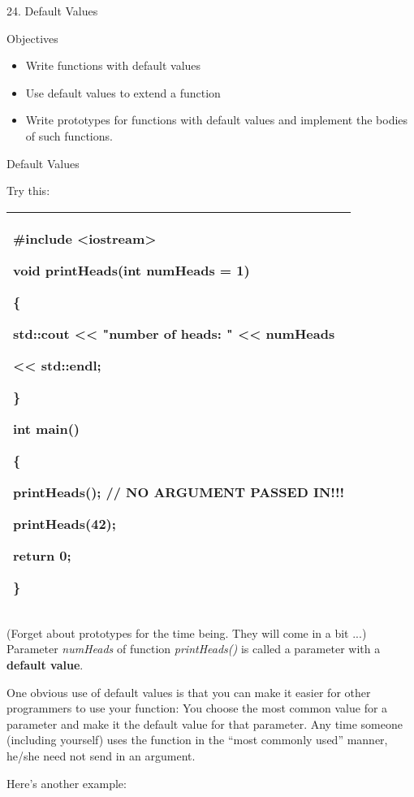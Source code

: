 \documentclass[
]{article}
\author{}
\date{}
\providecommand{\tightlist}{%
  \setlength{\itemsep}{0pt}\setlength{\parskip}{0pt}}
\begin{document}
24. Default Values

Objectives

\begin{itemize}
\tightlist
\item
  Write functions with default values
\item
  Use default values to extend a function
\item
  Write prototypes for functions with default values and implement the
  bodies of such functions.
\end{itemize}

Default Values

Try this:

\begin{longtable}[]{@{}l@{}}
\toprule
\endhead
\begin{minipage}[t]{0.97\columnwidth}\raggedright
\#include \textless iostream\textgreater{}

void printHeads(int numHeads\textbf{ = 1})

\{

std::cout \textless\textless{} "number of heads: " \textless\textless{}
numHeads

\textless\textless{} std::endl;

\}

int main()

\{

printHeads(); // NO ARGUMENT PASSED IN!!!

printHeads(42);

return 0;

\}\strut
\end{minipage}\tabularnewline
\bottomrule
\end{longtable}

(Forget about prototypes for the time being. They will come in a bit
...)\\

Parameter \emph{numHeads} of function \emph{printHeads()} is called a
parameter with a \textbf{default value}.

One obvious use of default values is that you can make it easier for
other programmers to use your function: You choose the most common value
for a parameter and make it the default value for that parameter. Any
time someone (including yourself) uses the function in the ``most
commonly used'' manner, he/she need not send in an argument.

Here's another example:
\end{document}
